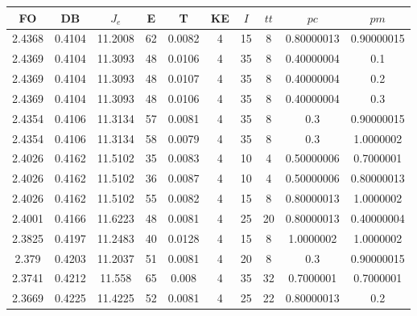 \begin{table}[h!]
    \footnotesize
    \begin{center}
        \begin{tabular}{|c|c|c|c|c|c|c|c|c|c|}
        \hline
            {\bf FO} & {\bf DB} & $J_e$ & {\bf E} & {\bf T} & {\bf KE} & $I$ & $tt$ & $pc$ & $pm$ \\
        \hline
        \hline
            2.4368 & 0.4104  & 11.2008 & 62 & 0.0082 & 4 & 15 & 8 & 0.80000013 & 0.90000015\\
        \hline
        \hline
            2.4369 & 0.4104  & 11.3093 & 48 & 0.0106 & 4 & 35 & 8 & 0.40000004 & 0.1\\
        \hline
        \hline
            2.4369 & 0.4104  & 11.3093 & 48 & 0.0107 & 4 & 35 & 8 & 0.40000004 & 0.2\\
        \hline
        \hline
            2.4369 & 0.4104  & 11.3093 & 48 & 0.0106 & 4 & 35 & 8 & 0.40000004 & 0.3\\
        \hline
        \hline
            2.4354 & 0.4106  & 11.3134 & 57 & 0.0081 & 4 & 35 & 8 & 0.3 & 0.90000015\\
        \hline
        \hline
            2.4354 & 0.4106  & 11.3134 & 58 & 0.0079 & 4 & 35 & 8 & 0.3 & 1.0000002\\
        \hline
        \hline
            2.4026 & 0.4162  & 11.5102 & 35 & 0.0083 & 4 & 10 & 4 & 0.50000006 & 0.7000001\\
        \hline
        \hline
            2.4026 & 0.4162  & 11.5102 & 36 & 0.0087 & 4 & 10 & 4 & 0.50000006 & 0.80000013\\
        \hline
        \hline
            2.4026 & 0.4162  & 11.5102 & 55 & 0.0082 & 4 & 15 & 8 & 0.80000013 & 1.0000002\\
        \hline
        \hline
            2.4001 & 0.4166  & 11.6223 & 48 & 0.0081 & 4 & 25 & 20 & 0.80000013 & 0.40000004\\
        \hline
        \hline
            2.3825 & 0.4197  & 11.2483 & 40 & 0.0128 & 4 & 15 & 8 & 1.0000002 & 1.0000002\\
        \hline
        \hline
            2.379 & 0.4203  & 11.2037 & 51 & 0.0081 & 4 & 20 & 8 & 0.3 & 0.90000015\\
        \hline
        \hline
            2.3741 & 0.4212  & 11.558 & 65 & 0.008 & 4 & 35 & 32 & 0.7000001 & 0.7000001\\
        \hline
        \hline
            2.3669 & 0.4225  & 11.4225 & 52 & 0.0081 & 4 & 25 & 22 & 0.80000013 & 0.2\\

\end{tabular}
\end{center}
\end{table}
